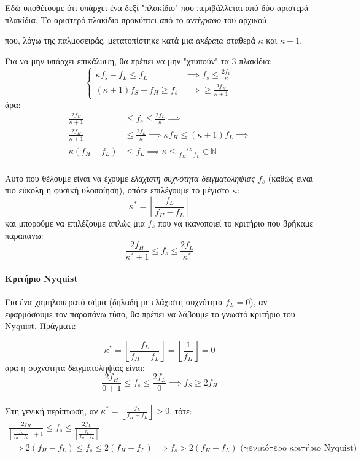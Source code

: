 \documentclass[11pt,a4paper,notitlepage,fleqn]{article}
\let\mytodo\todo
\renewcommand{\todo}[1]{\par\mytodo[inline,noline]{#1}}
\begin{document}
Εδώ υποθέτουμε ότι υπάρχει ένα δεξί "πλακίδιο" που περιβάλλεται από δύο αριστερά πλακίδια.
Το αριστερό πλακίδιο προκύπτει από το \emph{αντίγραφο} του αρχικού
που, λόγω της παλμοσειράς, μετατοπίστηκε κατά μια \emph{ακέραια} σταθερά \( κ \) και \( κ+1 \).

Για να μην υπάρχει επικάλυψη, θα πρέπει να μην "χτυπούν" τα 3 πλακίδια:\[
\begin{cases}
	κf_s-f_L \leq f_L &\implies f_s \leq \frac{2f_L}{κ} \\
	(κ+1)f_S - f_H \geq f_s &\implies \geq \frac{2f_H}{κ+1}
\end{cases}
\]
άρα:\begin{align*}
	\frac{2f_H}{κ+1} &\leq f_s \leq \frac{2f_L}{κ} \implies \\
	\frac{2f_H}{κ+1} &\leq \frac{2f_L}{κ} \implies κf_H \leq (κ+1)f_L \implies  \\
	κ(f_H-f_L) &\leq f_L \implies κ \leq \frac{f_L}{f_H-f_L} \in \mathbb N \\
\end{align*}

Αυτό που θέλουμε είναι να έχουμε \emph{ελάχιστη συχνότητα δειγματοληψίας \( f_s \)} (καθώς
είναι πιο εύκολη η φυσική υλοποίηση), οπότε επιλέγουμε το μέγιστο \( κ \):
\[
κ^* = \left\lfloor \frac{f_L}{f_H - f_L} \right\rfloor
\]
και μπορούμε να επιλέξουμε απλώς μια \( f_s \) που να ικανοποιεί το κριτήριο που βρήκαμε
παραπάνω:
\[
\frac{2f_H}{κ^*+1} \leq f_s \leq \frac{2f_L}{κ^*}
\]

\paragraph{Κριτήριο Nyquist}
Για ένα χαμηλοπερατό σήμα (δηλαδή με ελάχιστη συχνότητα \( f_L = 0 \)), αν εφαρμόσουμε τον
παραπάνω τύπο, θα πρέπει να λάβουμε το γνωστό κριτήριο του Nyquist. Πράγματι:

\[
κ^* = \left\lfloor \frac{f_L}{f_H - f_L} \right\rfloor = \left\lfloor \frac{1}{f_H} \right\rfloor = 0
\]
άρα η συχνότητα δειγματοληψίας είναι:
\[
\frac{2f_H}{0+1} \leq f_s \leq \frac{2f_L}{0} \implies \boxed{f_S \geq 2 f_H}
\]

\paragraph{}
Στη γενική περίπτωση, αν \( κ^* = \left\lfloor\frac{f_L}{f_H-f_L}\right\rfloor > 0 \), τότε:
\begin{gather*}
\frac{2f_H}{\left\lfloor \frac{f_L}{f_H-f_L} \right\rfloor + 1} \leq f_s \leq \frac{2f_L}{\left\lfloor \frac{f_L}{f_H-f_L} \right\rfloor}\\
\implies
2(f_H-f_L) \leq f_s \leq 2(f_H+f_L) \implies \boxed{f_s > 2(f_H-f_L)}
\text{ (γενικότερο κριτήριο Nyquist)}
\end{gather*}
\todo{check result}
\end{document}
